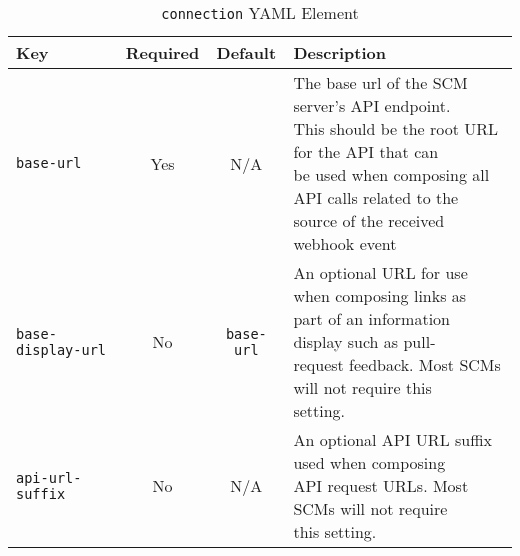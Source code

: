 \begin{table}[ht]
    \caption{\texttt{connection} YAML Element}  
    \label{tab:connection-section-keys}      
    \begin{tabularx}{\textwidth}{lccl}
        \toprule
        \textbf{Key} & \textbf{Required} & \textbf{Default} & \textbf{Description}\\
        \midrule
        \texttt{base-url} & Yes & N/A & \makecell[l]{The base url of the SCM server's API endpoint.\\This should be the 
        root URL for the API that can\\be used when composing all API calls related to the\\source of the received webhook event}\\
        \midrule

        \texttt{base-display-url} & No & \texttt{base-url} & \makecell[l]{An optional URL for use when composing links as
        \\part of an information display such as pull-\\request feedback. Most SCMs will not require this\\setting.}\\
        \midrule

        \texttt{api-url-suffix} & No & N/A & \makecell[l]{An optional API URL suffix used when composing\\API request URLs. Most SCMs
        will not require\\this setting.}\\
        \midrule


\end{tabularx}
\end{table}
